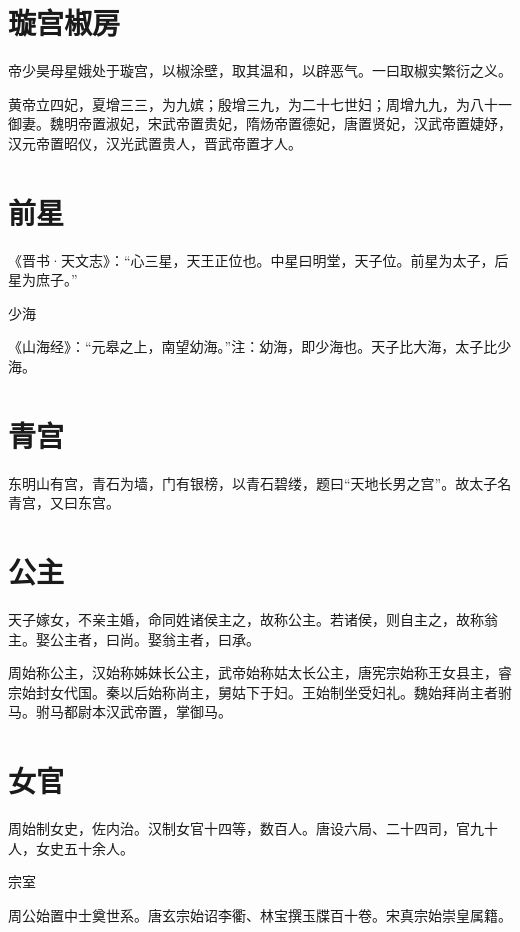 \documentclass[a4paper,12pt,UTF8,twoside]{ctexbook}
\begin{document}
    \section{璇宫椒房}
    
    帝少昊母星娥处于璇宫，以椒涂壁，取其温和，以辟恶气。一曰取椒实繁衍之义。
    
    黄帝立四妃，夏增三三，为九嫔；殷增三九，为二十七世妇；周增九九，为八十一御妻。魏明帝置淑妃，宋武帝置贵妃，隋炀帝置德妃，唐置贤妃，汉武帝置婕妤，汉元帝置昭仪，汉光武置贵人，晋武帝置才人。
    
    \section{前星}
    
    《晋书·天文志》：“心三星，天王正位也。中星曰明堂，天子位。前星为太子，后星为庶子。”
    
    少海
    
    《山海经》：“元皋之上，南望幼海。”注：幼海，即少海也。天子比大海，太子比少海。
    
    \section{青宫}
    
    东明山有宫，青石为墙，门有银榜，以青石碧缕，题曰“天地长男之宫”。故太子名青宫，又曰东宫。
    
    \section{公主}
    
    天子嫁女，不亲主婚，命同姓诸侯主之，故称公主。若诸侯，则自主之，故称翁主。娶公主者，曰尚。娶翁主者，曰承。
    
    周始称公主，汉始称姊妹长公主，武帝始称姑太长公主，唐宪宗始称王女县主，睿宗始封女代国。秦以后始称尚主，舅姑下于妇。王始制坐受妇礼。魏始拜尚主者驸马。驸马都尉本汉武帝置，掌御马。
    
    \section{女官}
    
    周始制女史，佐内治。汉制女官十四等，数百人。唐设六局、二十四司，官九十人，女史五十余人。
    
    宗室
    
    周公始置中士奠世系。唐玄宗始诏李衢、林宝撰玉牒百十卷。宋真宗始崇皇属籍。
    
\end{document}
